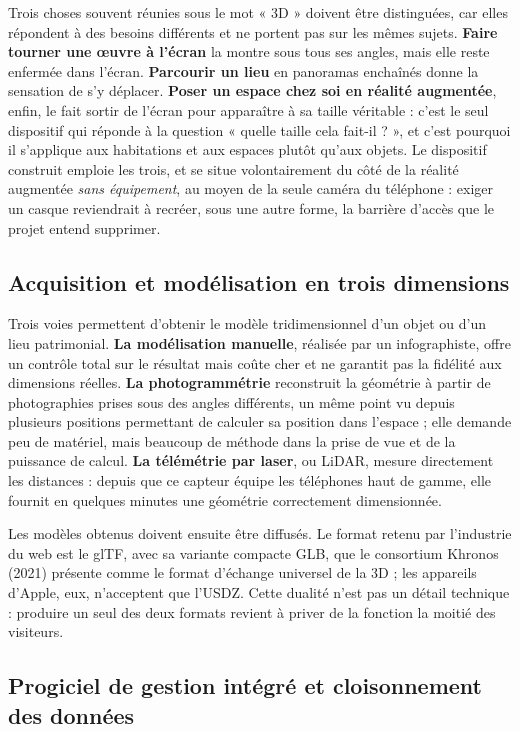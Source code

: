 Trois choses souvent réunies sous le mot « 3D » doivent être distinguées, car
elles répondent à des besoins différents et ne portent pas sur les mêmes sujets.
\textbf{Faire tourner une œuvre à l'écran} la montre sous tous ses angles, mais
elle reste enfermée dans l'écran. \textbf{Parcourir un lieu} en panoramas
enchaînés donne la sensation de s'y déplacer. \textbf{Poser un espace chez soi
en réalité augmentée}, enfin, le fait sortir de l'écran pour apparaître à sa
taille véritable : c'est le seul dispositif qui réponde à la question « quelle
taille cela fait-il ? », et c'est pourquoi il s'applique aux habitations et aux
espaces plutôt qu'aux objets. Le dispositif construit emploie les trois, et se
situe volontairement du côté de la réalité augmentée \emph{sans équipement}, au
moyen de la seule caméra du téléphone : exiger un casque reviendrait à recréer,
sous une autre forme, la barrière d'accès que le projet entend supprimer.

\subsection{Acquisition et modélisation en trois dimensions}

Trois voies permettent d'obtenir le modèle tridimensionnel d'un objet ou d'un
lieu patrimonial. \textbf{La modélisation manuelle}, réalisée par un
infographiste, offre un contrôle total sur le résultat mais coûte cher et ne
garantit pas la fidélité aux dimensions réelles. \textbf{La photogrammétrie}
reconstruit la géométrie à partir de photographies prises sous des angles
différents, un même point vu depuis plusieurs positions permettant de calculer
sa position dans l'espace ; elle demande peu de matériel, mais beaucoup de
méthode dans la prise de vue et de la puissance de calcul. \textbf{La télémétrie
par laser}, ou LiDAR, mesure directement les distances : depuis que ce capteur
équipe les téléphones haut de gamme, elle fournit en quelques minutes une
géométrie correctement dimensionnée.

Les modèles obtenus doivent ensuite être diffusés. Le format retenu par
l'industrie du web est le glTF, avec sa variante compacte GLB, que le consortium
Khronos (2021) présente comme le format d'échange universel de la 3D ; les
appareils d'Apple, eux, n'acceptent que l'USDZ. Cette dualité n'est pas un
détail technique : produire un seul des deux formats revient à priver de la
fonction la moitié des visiteurs.

\subsection{Progiciel de gestion intégré et cloisonnement des données}

